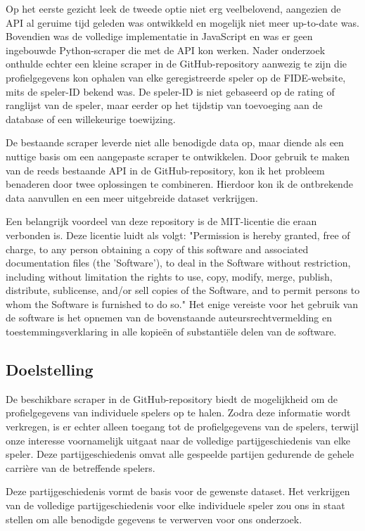 Op het eerste gezicht leek de tweede optie niet erg veelbelovend, aangezien de API al geruime tijd geleden was ontwikkeld en mogelijk niet meer up-to-date was. Bovendien was de volledige implementatie in JavaScript en was er geen ingebouwde Python-scraper die met de API kon werken. Nader onderzoek onthulde echter een kleine scraper in de GitHub-repository aanwezig te zijn die profielgegevens kon ophalen van elke geregistreerde speler op de FIDE-website, mits de speler-ID bekend was. De speler-ID is niet gebaseerd op de rating of ranglijst van de speler, maar eerder op het tijdstip van toevoeging aan de database of een willekeurige toewijzing.

De bestaande scraper leverde niet alle benodigde data op, maar diende als een nuttige basis om een aangepaste scraper te ontwikkelen. Door gebruik te maken van de reeds bestaande API in de GitHub-repository, kon ik het probleem benaderen door twee oplossingen te combineren. Hierdoor kon ik de ontbrekende data aanvullen en een meer uitgebreide dataset verkrijgen.

Een belangrijk voordeel van deze repository is de MIT-licentie die eraan verbonden is. Deze licentie luidt als volgt: "Permission is hereby granted, free of charge, to any person obtaining a copy of this software and associated documentation files (the 'Software'), to deal in the Software without restriction, including without limitation the rights to use, copy, modify, merge, publish, distribute, sublicense, and/or sell copies of the Software, and to permit persons to whom the Software is furnished to do so." Het enige vereiste voor het gebruik van de software is het opnemen van de bovenstaande auteursrechtvermelding en toestemmingsverklaring in alle kopieën of substantiële delen van de software.

\subsection{Doelstelling}

De beschikbare scraper in de GitHub-repository biedt de mogelijkheid om de profielgegevens van individuele spelers op te halen. Zodra deze informatie wordt verkregen, is er echter alleen toegang tot de profielgegevens van de spelers, terwijl onze interesse voornamelijk uitgaat naar de volledige partijgeschiedenis van elke speler. Deze partijgeschiedenis omvat alle gespeelde partijen gedurende de gehele carrière van de betreffende spelers.

Deze partijgeschiedenis vormt de basis voor de gewenste dataset. Het verkrijgen van de volledige partijgeschiedenis voor elke individuele speler zou ons in staat stellen om alle benodigde gegevens te verwerven voor ons onderzoek.

